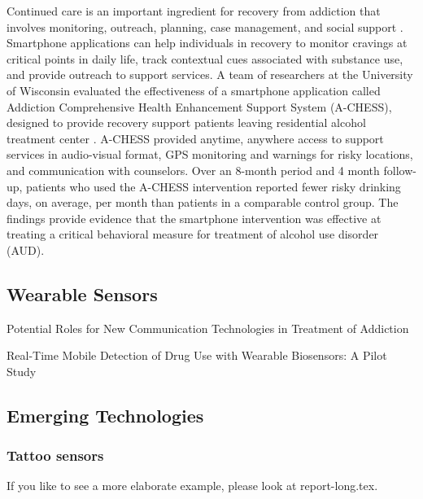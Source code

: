\documentclass[sigconf]{acmart}
\begin{document}
Continued care is an important ingredient for recovery from addiction that
involves monitoring, outreach, planning, case management, and social support 
\cite{johnson11}. Smartphone applications can help individuals in recovery to 
monitor cravings at critical points in daily life, track contextual cues 
associated with substance use, and provide outreach to support services. A team 
of researchers at the University of Wisconsin evaluated the effectiveness of a
smartphone application called Addiction Comprehensive Health Enhancement Support 
System (A-CHESS), designed to provide recovery support patients leaving 
residential alcohol treatment center \cite{gustafson14}. A-CHESS provided anytime, 
anywhere access to support services in audio-visual format, GPS monitoring and 
warnings for risky locations, and communication with counselors. Over an 8-month
period and 4 month follow-up, patients who used the A-CHESS intervention reported
fewer risky drinking days, on average, per month than patients in a comparable
control group. The findings provide evidence that the smartphone intervention was 
effective at treating a critical behavioral measure for treatment of alcohol use 
disorder (AUD). 


\subsection{Wearable Sensors}

Potential Roles for New Communication Technologies in Treatment of Addiction 
\cite{johnson11}



Real-Time Mobile Detection of Drug Use with Wearable Biosensors:
A Pilot Study
\cite{carreiro15}

\subsection{Emerging Technologies}

\subsubsection{Tattoo sensors}

If you like to see a more elaborate example, please look at
report-long.tex. 
\end{document}
